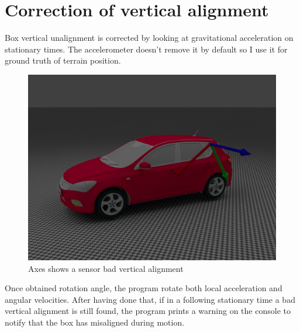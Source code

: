 \section{Correction of vertical alignment}
Box vertical unalignment is corrected by looking at gravitational acceleration on stationary times. The accelerometer doesn't remove it by default so I use it for ground truth of terrain position.
\begin{figure}[H]
\includegraphics[width=\textwidth]{kia_bad_z_align.jpg}
\caption{Axes shows a sensor bad vertical alignment}
\end{figure}

Once obtained rotation angle, the program rotate both local acceleration and angular velocities. After having done that, if in a following stationary time a bad vertical alignment is still found, the program prints a warning on the console to notify that the box has misaligned during motion.

